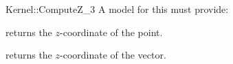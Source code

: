 \begin{ccRefFunctionObjectConcept}{Kernel::ComputeZ_3}
A model for this must provide:


       {returns the $z$-coordinate of the point.}

       {returns the $z$-coordinate of the vector.}

\ccRefines
{}



\end{ccRefFunctionObjectConcept}
